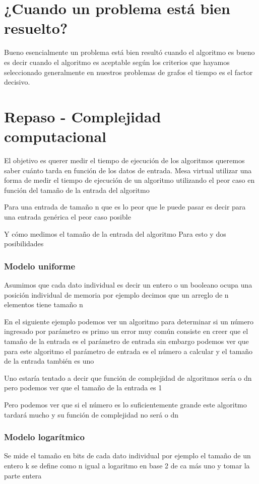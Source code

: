 \documentclass[12pt]{book}
\begin{document}
\section{¿Cuando un problema está bien resuelto?}
Bueno esencialmente un problema está bien resultó cuando el algoritmo es bueno es decir cuando el algoritmo es aceptable según los criterios que hayamos seleccionado generalmente en nuestros problemas de grafos el tiempo es el factor decisivo.

\section{Repaso - Complejidad computacional}
El objetivo es querer medir el tiempo de ejecución de los algoritmos queremos saber cuánto tarda en función de los datos de entrada.
Mesa virtual utilizar una forma de medir el tiempo de ejecución de un algoritmo utilizando el peor caso en función del tamaño de la entrada del algoritmo

Para una entrada de tamaño n que es lo peor que le puede pasar es decir para una entrada genérica el peor caso posible

Y cómo medimos el tamaño de la entrada del algoritmo
Para esto y dos posibilidades

\subsubsection{Modelo uniforme}
Asumimos que cada dato individual es decir un entero o un booleano ocupa una posición individual de memoria por ejemplo decimos que un arreglo de n elementos tiene tamaño n

En el siguiente ejemplo podemos ver un algoritmo para determinar si un número ingresado por parámetro es primo un error muy común consiste en creer que el tamaño de la entrada es el parámetro de entrada sin embargo podemos ver que para este algoritmo el parámetro de entrada es el número a calcular y el tamaño de la entrada también es uno

Uno estaría tentado a decir que función de complejidad de algoritmos sería o dn pero podemos ver que el tamaño de la entrada es 1

Pero podemos ver que si el número es lo suficientemente grande este algoritmo tardará mucho y su función de complejidad no será o dn

\subsubsection{Modelo logarítmico}
Se mide el tamaño en bits de cada dato individual por ejemplo el tamaño de un entero k se define como n igual a logaritmo en base 2 de ca más uno y tomar la parte entera
\end{document}
